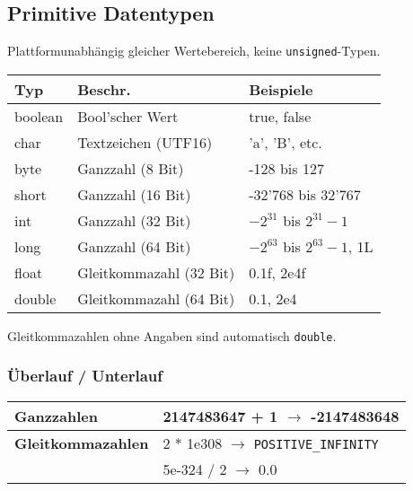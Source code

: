 {\subsection{Primitive Datentypen}
    Plattformunabhängig gleicher Wertebereich, keine \verb|unsigned|-Typen.
    \vspace{-0.1cm} 

    \begin{center}
        \begin{tabular}{lll}
            \rowcolor[RGB]{239,239,239} 
            \textbf{Typ} & \textbf{Beschr.}        & \textbf{Beispiele} \\ \hline
            boolean      & Bool'scher Wert         & true, false \\
            char         & Textzeichen (UTF16)     & 'a', 'B', etc. \\
            byte         & Ganzzahl (8 Bit)        & -128 bis 127 \\
            short        & Ganzzahl (16 Bit)       & -32'768 bis 32'767 \\
            int          & Ganzzahl (32 Bit)       & $ -2^{31} $ bis $ 2^{31}-1 $ \\
            long         & Ganzzahl (64 Bit)       & $ -2^{63} $ bis $ 2^{63}-1 $, 1L \\
            float        & Gleitkommazahl (32 Bit) & 0.1f, 2e4f \\
            double       & Gleitkommazahl (64 Bit) & 0.1, 2e4 \\
        \end{tabular}
    \end{center}
    \vspace{-0.2cm}

    Gleitkommazahlen ohne Angaben sind automatisch \verb|double|.

    \vspace{-0.1cm} 

    \subsubsection{Überlauf / Unterlauf}
        \begin{tabular}{ll}
            \textbf{Ganzzahlen}         & 2147483647 + 1 $ \rightarrow $ -2147483648 \\ \hline
            \textbf{Gleitkommazahlen}   & 2 * 1e308 $ \rightarrow $ \verb|POSITIVE_INFINITY|\\
            & 5e-324 / 2 $ \rightarrow $ 0.0\\
        \end{tabular}
        \vspace{-0.3cm}

}
